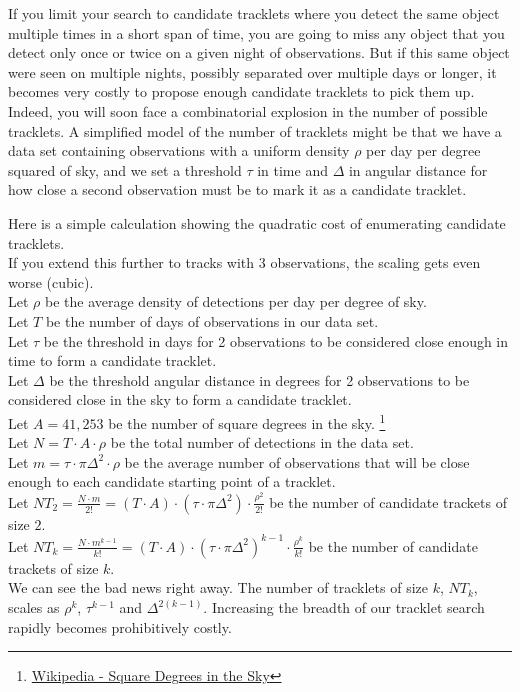 If you limit your search to candidate tracklets where you detect the same object multiple times in a short span of time,
you are going to miss any object that you detect only once or twice on a given night of observations.
But if this same object were seen on multiple nights, possibly separated over multiple days or longer, 
it becomes very costly to propose enough candidate tracklets to pick them up.
Indeed, you will soon face a combinatorial explosion in the number of possible tracklets.
A simplified model of the number of tracklets might be that we have a data set containing 
observations with a uniform density $\rho$ per day per degree squared of sky,
and we set a threshold $\tau$ in time and $\Delta$ in angular distance for how close a second observation must be to mark it as a candidate tracklet.

Here is a simple calculation showing the quadratic cost of enumerating candidate tracklets. \\
If you extend this further to tracks with 3 observations, the scaling gets even worse (cubic).\\
Let $\rho$ be the average density of detections per day per degree of sky.\\
Let $T$ be the number of days of observations in our data set.\\
Let $\tau$ be the threshold in days for 2 observations to be considered close enough in time to form a candidate tracklet.\\
Let $\Delta$ be the threshold angular distance in degrees for 2 observations to be considered close in the sky to form a candidate tracklet.\\
Let $A = 41,253$ be the number of square degrees in the sky.
\footnote{\href{https://en.wikipedia.org/wiki/Square_degree}{Wikipedia - Square Degrees in the Sky}}\\
Let $N = T \cdot A \cdot \rho $ be the total number of detections in the data set.\\
Let $\displaystyle{m = \tau \cdot \pi \Delta^2 \cdot \rho}$ be the average number of observations that will be close enough
to each candidate starting point of a tracklet.\\
Let $\displaystyle{NT_{2} = \frac{N \cdot m}{2!} = (T \cdot A) \cdot (\tau \cdot \pi \Delta^2) \cdot \frac{\rho^{2}}{2!} }$ 
be the number of candidate trackets of size $2$. \\
Let $\displaystyle{NT_{k} = \frac{N \cdot m^{k-1}}{k!} = (T \cdot A) \cdot (\tau \cdot \pi \Delta^2)^{k-1} \cdot \frac{\rho^{k}}{k!} }$ 
be the number of candidate trackets of size $k$. \\
We can see the bad news right away.
The number of tracklets of size $k$, $NT_{k}$, scales as $\rho^{k}$, $\tau^{k-1}$ and $\Delta^{2(k-1)}$.
Increasing the breadth of our tracklet search rapidly becomes prohibitively costly.

